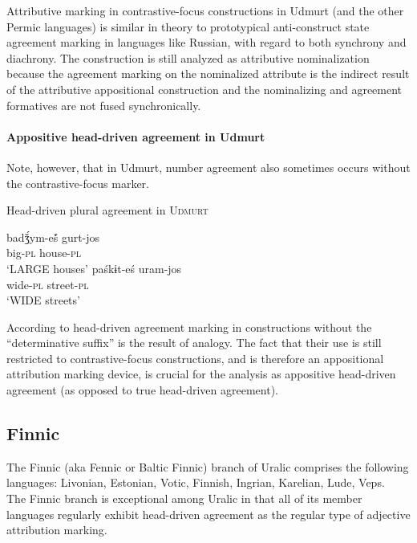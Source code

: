 Attributive marking in contrastive-focus constructions in Udmurt (and the other Permic languages) is similar in theory to prototypical anti-construct state agreement marking in languages like Russian, with regard to both synchrony and diachrony. The construction is still analyzed as attributive nominalization because the agreement marking on the nominalized attribute is the indirect result of the attributive appositional construction and the nominalizing and agreement formatives are not fused synchronically.

\paragraph{Appositive head-driven agreement in Udmurt}
Note, however, that in Udmurt, number agreement also sometimes occurs without the contrastive-focus marker.
\newpage
\begin{exe}
\ex Head-driven plural agreement in \textsc{Udmurt}
\begin{xlist}
\ex 
\gll	badǯ́ym-eš́ gurt-jos\\
	big-\textsc{pl} house-\textsc{pl}\\
\glt	‘LARGE houses’ \citep[40]{winkler2001}
\ex 
\gll	paśkɨt-eś uram-jos\\
	wide-\textsc{pl} street-\textsc{pl}\\
\glt	‘WIDE streets’  \citep[63]{csucs1990}
\end{xlist}
\end{exe}
According to \citet[63]{csucs1990} head-driven agreement marking in constructions without the “determinative suffix” is the result of analogy. The fact that their use is still restricted to contrastive-focus constructions, and is therefore an appositional attribution marking device, is crucial for the analysis as appositive head-driven agreement (as opposed to true head-driven agreement).

\subsection{Finnic}
The Finnic (aka Fennic or Baltic Finnic) branch of Uralic comprises the following languages: Livonian, Estonian, Votic, Finnish, Ingrian, Karelian, Lude, Veps.\\

\noindent The Finnic branch is exceptional among Uralic in that all of its member languages regularly exhibit head-driven agreement as the regular type of adjective attribution marking.

